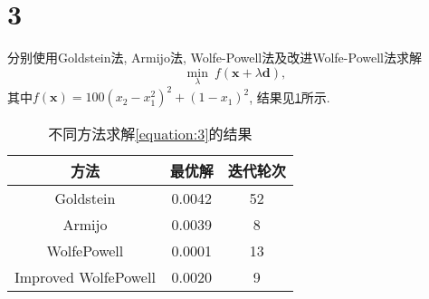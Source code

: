\section*{3}

分别使用Goldstein法, Armijo法, Wolfe-Powell法及改进Wolfe-Powell法求解
\begin{equation}
    \min_\lambda ~ f(\bm{x}+\lambda\bm{d}),
    \label{equation:3}
\end{equation}
其中$f(\bm{x})=100(x_2-x_1^2)^2+(1-x_1)^2$, 结果见\cref{table:3}所示.

\begin{table}[ht]
    \centering
    \caption{不同方法求解\cref{equation:3}的结果}
    \label{table:3}
    \begin{tabular}{ccc}
        \toprule
        方法 & 最优解 & 迭代轮次 \\
        \midrule
        Goldstein & 0.0042 & 52 \\
        Armijo & 0.0039 & 8 \\
        WolfePowell & 0.0001 & 13 \\
        Improved WolfePowell & 0.0020 & 9 \\
        \bottomrule
    \end{tabular}
\end{table}

